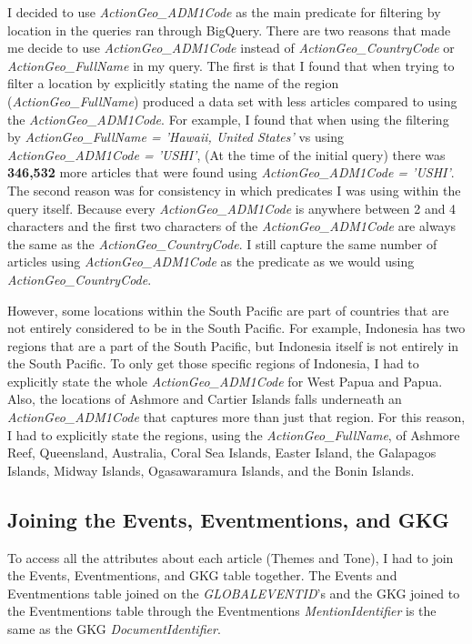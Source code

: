 \documentclass[12pt]{article}
\begin{document}
I decided to use \textit{ActionGeo\_ADM1Code} as the main predicate for filtering by location in the queries ran through BigQuery. There are two reasons that made me decide to use \textit{ActionGeo\_ADM1Code} instead of \textit{ActionGeo\_CountryCode} or \textit{ActionGeo\_FullName} in my query. The first is that I found that when trying to filter a location by explicitly stating the name of the region (\textit{ActionGeo\_FullName}) produced a data set with less articles compared to using the \textit{ActionGeo\_ADM1Code}. For example, I found that when using the filtering by \textit{ActionGeo\_FullName = 'Hawaii, United States'} vs using \textit{ActionGeo\_ADM1Code = 'USHI'}, (At the time of the initial query) there was \textbf{346,532} more articles that were found using \textit{ActionGeo\_ADM1Code = 'USHI'}. The second reason was for consistency in which predicates I was using within the query itself. Because every \textit{ActionGeo\_ADM1Code} is anywhere between 2 and 4 characters and the first two characters of the \textit{ActionGeo\_ADM1Code} are always the same as the \textit{ActionGeo\_CountryCode}. I still capture the same number of articles using \textit{ActionGeo\_ADM1Code} as the predicate as we would using \textit{ActionGeo\_CountryCode}. 

However, some locations within the South Pacific are part of countries that are not entirely considered to be in the South Pacific. For example, Indonesia has two regions that are a part of the South Pacific, but Indonesia itself is not entirely in the South Pacific. To only get those specific regions of Indonesia, I had to explicitly state the whole \textit{ActionGeo\_ADM1Code} for West Papua and Papua. Also, the locations of Ashmore and Cartier Islands falls underneath an \textit{ActionGeo\_ADM1Code} that captures more than just that region. For this reason, I had to explicitly state the regions, using the \textit{ActionGeo\_FullName}, of Ashmore Reef, Queensland, Australia, Coral Sea Islands, Easter Island, the Galapagos Islands, Midway Islands, Ogasawaramura Islands, and the Bonin Islands. 

\subsection*{Joining the Events, Eventmentions, and GKG}

To access all the attributes about each article (Themes and Tone), I had to join the Events, Eventmentions, and GKG table together. The Events and Eventmentions table joined on the \textit{GLOBALEVENTID}'s and the GKG joined to the Eventmentions table through the Eventmentions \textit{MentionIdentifier} is the same as the GKG \textit{DocumentIdentifier}. 
    
\end{document}
